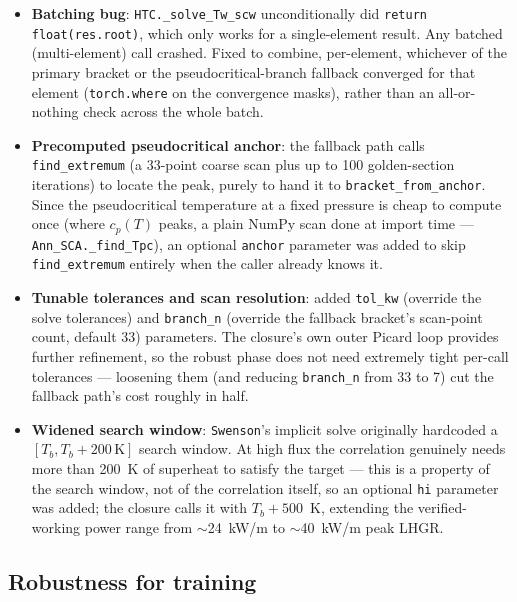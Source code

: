\documentclass[11pt]{article}
\begin{document}
\begin{itemize}
\item \textbf{Batching bug}: \texttt{HTC.\_solve\_Tw\_scw} unconditionally
did \texttt{return float(res.root)}, which only works for a single-element
result. Any batched (multi-element) call crashed. Fixed to combine,
per-element, whichever of the primary bracket or the pseudocritical-branch
fallback converged for that element (\texttt{torch.where} on the
convergence masks), rather than an all-or-nothing check across the whole
batch.
\item \textbf{Precomputed pseudocritical anchor}: the fallback path calls
\texttt{find\_extremum} (a 33-point coarse scan plus up to 100
golden-section iterations) to locate the peak, purely to hand it to
\texttt{bracket\_from\_anchor}. Since the pseudocritical temperature at a
fixed pressure is cheap to compute once (where $c_p(T)$ peaks, a plain
NumPy scan done at import time --- \texttt{Ann\_SCA.\_find\_Tpc}), an
optional \texttt{anchor} parameter was added to skip \texttt{find\_extremum}
entirely when the caller already knows it.
\item \textbf{Tunable tolerances and scan resolution}: added
\texttt{tol\_kw} (override the solve tolerances) and \texttt{branch\_n}
(override the fallback bracket's scan-point count, default 33) parameters.
The closure's own outer Picard loop provides further refinement, so the
robust phase does not need extremely tight per-call tolerances --- loosening
them (and reducing \texttt{branch\_n} from 33 to 7) cut the fallback path's
cost roughly in half.
\item \textbf{Widened search window}: \texttt{Swenson}'s implicit solve
originally hardcoded a $[T_b, T_b+200\,\mathrm{K}]$ search window. At high
flux the correlation genuinely needs more than 200~K of superheat to
satisfy the target --- this is a property of the search window, not of the
correlation itself, so an optional \texttt{hi} parameter was added; the
closure calls it with $T_b + 500$~K, extending the verified-working power
range from $\sim$24~kW/m to $\sim$40~kW/m peak LHGR.
\end{itemize}

\subsection{Robustness for training}
\end{document}
